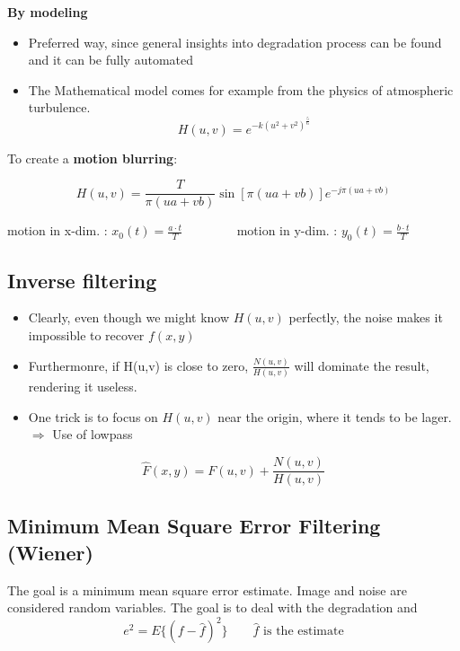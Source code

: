 \textbf{By modeling}\\
	\begin{itemize}
		\item Preferred way, since general insights into degradation process can be found and it can be fully automated
		\item The Mathematical model comes for example from the physics of atmospheric turbulence. 
			\begin{equation}
				H(u,v) = e^{-k(u^2+v^2)^{\frac{5}{6}}}
			\end{equation}
	\end{itemize}


To create a \textbf{motion blurring}:

	\begin{equation}
		H(u,v) = \frac{T}{\pi (ua + vb)}\sin[\pi (ua + vb)] e^{-j \pi(ua + vb)}
	\end{equation}

	\begin{center}
		motion in x-dim. : $x_0(t) = \frac{a \cdot t}{T} \qquad \qquad$ 
		motion in y-dim. : $y_0(t) = \frac{b \cdot t}{T}$
	\end{center}

\subsection{Inverse filtering }

\begin{itemize}
	\item Clearly, even though we might know $H(u,v)$ perfectly, the noise makes it impossible to recover $f(x,y)$
	\item Furthermonre, if H(u,v) is close to zero, $\frac{N(u,v)}{H(u,v)}$ will dominate the result, rendering it useless.
	\item One trick is to focus on $H(u,v)$ near the origin, where it tends to be lager. $\Rightarrow$ Use of lowpass
\end{itemize}

\begin{equation}
	\hat{F}(x,y)= F(u,v) + \frac{N(u,v)}{H(u,v)}
\end{equation}


\subsection{Minimum Mean Square Error Filtering (Wiener) }
The goal is a minimum mean square error estimate. Image and noise are considered random variables. The goal is to deal with the degradation and 
\begin{equation}
	e^2 = E\{(f- \hat{f})^2 \} \qquad \hat{f} \text{ is the estimate}
\end{equation}


